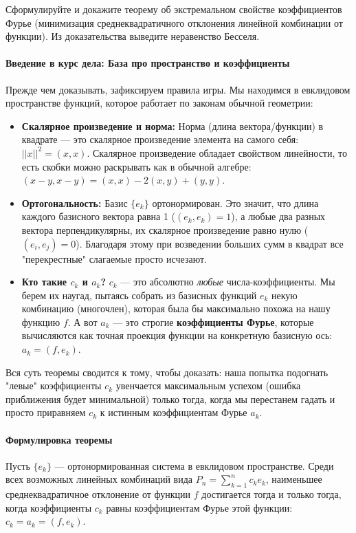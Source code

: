 {Сформулируйте и докажите теорему об экстремальном свойстве коэффициентов Фурье (минимизация среднеквадратичного отклонения линейной комбинации от функции). Из доказательства выведите неравенство Бесселя.}

\paragraph{Введение в курс дела: База про пространство и коэффициенты}
Прежде чем доказывать, зафиксируем правила игры. Мы находимся в евклидовом пространстве функций, которое работает по законам обычной геометрии:
\begin{itemize}
    \item \textbf{Скалярное произведение и норма:} Норма (длина вектора/функции) в квадрате — это скалярное произведение элемента на самого себя: $||x||^2 = (x, x)$. Скалярное произведение обладает свойством линейности, то есть скобки можно раскрывать как в обычной алгебре: $(x-y, x-y) = (x, x) - 2(x, y) + (y, y)$.
    \item \textbf{Ортогональность:} Базис $\{e_k\}$ ортонормирован. Это значит, что длина каждого базисного вектора равна 1 ($(e_k, e_k) = 1$), а любые два разных вектора перпендикулярны, их скалярное произведение равно нулю ($(e_i, e_j) = 0$). Благодаря этому при возведении больших сумм в квадрат все "перекрестные" слагаемые просто исчезают.
    \item \textbf{Кто такие $c_k$ и $a_k$?} $c_k$ — это абсолютно \textit{любые} числа-коэффициенты. Мы берем их наугад, пытаясь собрать из базисных функций $e_k$ некую комбинацию (многочлен), которая была бы максимально похожа на нашу функцию $f$. А вот $a_k$ — это строгие \textbf{коэффициенты Фурье}, которые вычисляются как точная проекция функции на конкретную базисную ось: $a_k = (f, e_k)$. 
\end{itemize}
Вся суть теоремы сводится к тому, чтобы доказать: наша попытка подогнать "левые" коэффициенты $c_k$ увенчается максимальным успехом (ошибка приближения будет минимальной) только тогда, когда мы перестанем гадать и просто приравняем $c_k$ к истинным коэффициентам Фурье $a_k$.

\paragraph{Формулировка теоремы}
Пусть $\{e_k\}$ — ортонормированная система в евклидовом пространстве. Среди всех возможных линейных комбинаций вида $P_n = \sum_{k=1}^n c_k e_k$, наименьшее среднеквадратичное отклонение от функции $f$ достигается тогда и только тогда, когда коэффициенты $c_k$ равны коэффициентам Фурье этой функции: $c_k = a_k = (f, e_k)$.

